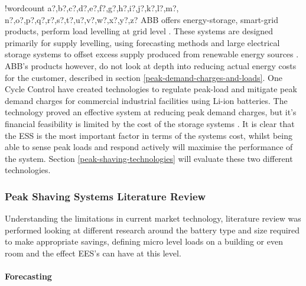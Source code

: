 \documentclass[10pt]{article}
\let\oldparagraph\paragraph
\renewcommand{\paragraph}[1]{\oldparagraph{#1}\mbox{}}
\newcounter{words}
\newenvironment{counted}{%
  \setcounter{words}{0}
  \SearchList!{wordcount}{\stepcounter{words}}
    {a?,b?,c?,d?,e?,f?,g?,h?,i?,j?,k?,l?,m?,
    n?,o?,p?,q?,r?,s?,t?,u?,v?,w?,x?,y?,z?}
  \UndoBoundary{'}
  \SearchOrder{p;}}{%
  \StopSearching}
\begin{document}
\begin{counted}
ABB offers energy-storage, smart-grid products, perform load levelling
at grid level \cite{abbpeakshave}. These systems are designed primarily
for supply levelling, using forecasting methods and large electrical
storage systems to offset excess supply produced from renewable energy
sources \cite{5559470}. ABB's products however, do not look at depth
into reducing actual energy costs for the customer, described in section
\ref{peak-demand-charges-and-loads}. One Cycle Control have created
technologies to regulate peak-load and mitigate peak demand charges for
commercial industrial facilities using Li-ion
batteries\cite{peakload38:online}. The technology proved an effective
system at reducing peak demand charges, but it's financial feasibility
is limited by the cost of the storage systems \cite{Demonstr51:online}.
It is clear that the ESS is the most important factor in terms of the
systems cost, whilst being able to sense peak loads and respond actively
will maximise the performance of the system. Section
\ref{peak-shaving-technologies} will evaluate these two different
technologies.

\subsubsection{Peak Shaving Systems Literature
Review}\label{peak-shaving-systems-literature-review}

Understanding the limitations in current market technology, literature
review was performed looking at different research around the battery
type and size required to make appropriate savings, defining micro level
loads on a building or even room and the effect EES's can have at this
level.

\paragraph{Forecasting}\label{forecasting}


\end{counted}
\end{document}
